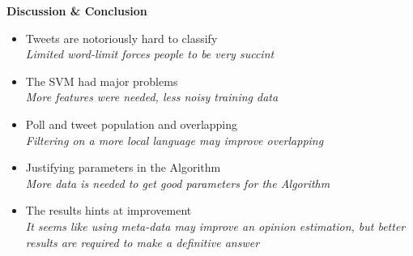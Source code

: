 \documentclass[landscape,20pt]{extarticle}
\newcommand*{\TitleFont}{\Huge \bf}
\newcommand*{\TextFont}{\normalsize \it}
\begin{document}
\clearpage
\thispagestyle{empty}

{\TitleFont Discussion \& Conclusion}
\Large
\begin{itemize}
\item Tweets are notoriously hard to classify\\
{\TextFont Limited word-limit forces people to be very succint}
\item The SVM had major problems\\
{\TextFont More features were needed, less noisy training data}
\item Poll and tweet population and overlapping\\
{\TextFont Filtering on a more local language may improve overlapping}
\item Justifying parameters in the Algorithm\\
{\TextFont More data is needed to get good parameters for the Algorithm}
\item The results hints at improvement\\
{\TextFont It seems like using meta-data may improve an opinion estimation, but better results are required to make a definitive answer}
\end{itemize}
\end{document}
